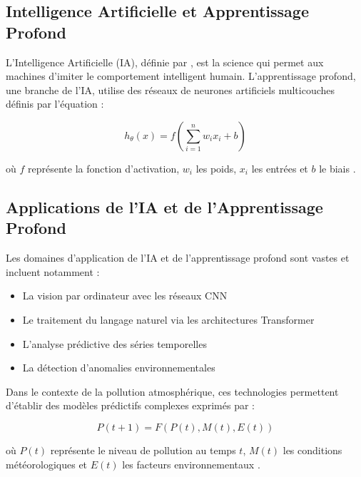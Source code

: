 \documentclass[12pt,a4paper]{report}
\begin{document}
\subsection{Intelligence Artificielle et Apprentissage Profond}
L'Intelligence Artificielle (IA), définie par \cite{Russell2010}, est la science qui permet aux machines d'imiter le comportement intelligent humain. L'apprentissage profond, une branche de l'IA, utilise des réseaux de neurones artificiels multicouches définis par l'équation :

\begin{equation}
    h_{\theta}(x) = f(\sum_{i=1}^{n} w_i x_i + b)
\end{equation}

où $f$ représente la fonction d'activation, $w_i$ les poids, $x_i$ les entrées et $b$ le biais \cite{Goodfellow2016}.
\subsection{Applications de l'IA et de l'Apprentissage Profond}
Les domaines d'application de l'IA et de l'apprentissage profond sont vastes et incluent notamment :
\begin{itemize}
    \item La vision par ordinateur avec les réseaux CNN \cite{LeCun2015}
    \item Le traitement du langage naturel via les architectures Transformer
    \item L'analyse prédictive des séries temporelles
    \item La détection d'anomalies environnementales
\end{itemize}

Dans le contexte de la pollution atmosphérique, ces technologies permettent d'établir des modèles prédictifs complexes exprimés par :

\begin{equation}
    P(t+1) = F(P(t), M(t), E(t))
\end{equation}

où $P(t)$ représente le niveau de pollution au temps $t$, $M(t)$ les conditions météorologiques et $E(t)$ les facteurs environnementaux \cite{Zhang2020}.



\end{document}

